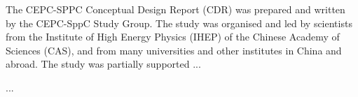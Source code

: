 \documentclass{wileysev}
\begin{document}
\subtitle{\fontsize{27}{32} \\ \vspace{30pt}
\fontsize{26}{32} \\ \vspace{260pt}
\huge{} \\ \vspace{18pt}
\huge{} \\
\vspace{-720pt}
\hfill \Large{\selectfont{IHEP-CEPC-DR-2018-XX}} \\ \vspace{15pt}
\hfill \Large{\selectfont{IHEP-EP-2018-XX}} \\ \vspace{15pt}
\hfill \Large{\selectfont{IHEP-TH-2018-XX}}
}

\authors{}
\offprintinfo{}{}


\titlepage


%




\begin{acknowledgments}
The CEPC-SPPC Conceptual Design Report (CDR) was prepared and written by the CEPC-SppC Study Group. The study was organised and led by scientists from the Institute of High Energy Physics (IHEP) of the Chinese Academy of Sciences (CAS), and from many universities and other institutes in China and abroad. The study was partially supported ...


...

\end{acknowledgments}




\tableofcontents


%
%
%
%
%
%
%
%
%
%
%

%

\end{document}
